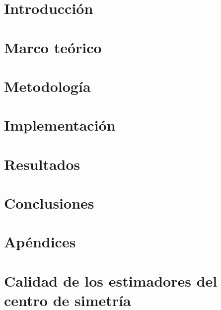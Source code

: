 \documentclass[11pt]{article}
\begin{document}

\bigskip


\section*{Introducción}


\newpage
\section{Marco teórico}
\label{marco_teorico}


\newpage
\section{Metodología}


\newpage
\section{Implementación}



\newpage
\section{Resultados}


\newpage
\section{Conclusiones}



\newpage
\section*{Apéndices}
\appendix

\section{Calidad de los estimadores del centro de simetría}
\label{apendix_qualiti_theta_estimators}

\end{document}
